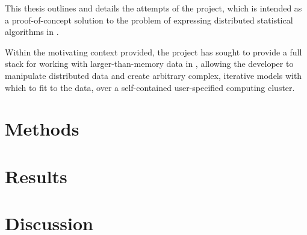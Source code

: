 This thesis outlines and details the attempts of the \lsr{} project, which is intended as a proof-of-concept solution to the problem of expressing distributed statistical algorithms in \R{}.

Within the motivating context provided, the \lsr{} project has sought to provide a full stack for working with larger-than-memory data in \R{}, allowing the developer to manipulate distributed data and create arbitrary complex, iterative models with which to fit to the data, over a self-contained user-specified computing cluster.

\section{Methods}\label{sec:methods}

\section{Results}\label{sec:results}

\section{Discussion}\label{sec:discussion}

